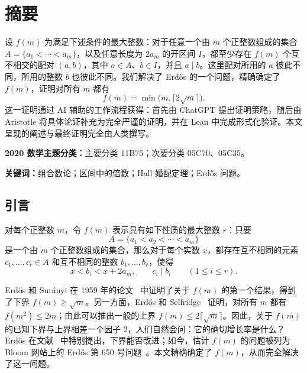 \documentclass[UTF8,a4paper,oneside,openany,fontset=fandol,zihao=-4]{ctexbook}
\theoremstyle{chinesestyle}
\begin{document}
\clearpage
\tableofcontents
\clearpage
\mainmatter
\chapter*{摘要}

设 $f(m)$ 为满足下述条件的最大整数：对于任意一个由 $m$ 个正整数组成的集合 $A=\{a_1<\cdots<a_m\}$，以及任意长度为 $2a_m$ 的开区间 $I$，都至少存在 $f(m)$ 个互不相交的配对 $(a,b)$，其中 $a\in A$、$b\in I$，并且 $a\mid b$。这里配对所用的 $a$ 彼此不同，所用的整数 $b$ 也彼此不同。我们解决了 Erd\H{o}s 的一个问题，精确确定了 $f(m)$，证明对所有 $m$ 都有
\[
\boxed{f(m)=\min\bigl(m,\lceil2\sqrt m\rceil\bigr).}
\]
这一证明通过 AI 辅助的工作流程获得：首先由 ChatGPT 提出证明策略，随后由 Aristotle 将具体论证补充为完全严谨的证明，并在 Lean 中完成形式化验证。本文呈现的阐述与最终证明完全由人类撰写。

\medskip
\noindent\textbf{2020 数学主题分类：}主要分类 11B75；次要分类 05C70、05C35。

\smallskip
\noindent\textbf{关键词：}组合数论；区间中的倍数；Hall 婚配定理；Erd\H{o}s 问题。

\section{引言}\label{sec:introduction}

对每个正整数 $m$，令 $f(m)$ 表示具有如下性质的最大整数 $r$：只要
\[
A=\{a_1<a_2<\cdots<a_m\}
\]
是一个由 $m$ 个正整数组成的集合，那么对于每个实数 $x$，都存在互不相同的元素 $c_1,\ldots,c_r\in A$ 和互不相同的整数 $b_1,\ldots,b_r$，使得
\[
x<b_i<x+2a_m,
\qquad c_i\mid b_i
\qquad (1\leq i\leq r).
\]

Erd\H{o}s 和 Sur\'{a}nyi 在 1959 年的论文~\cite{ref10} 中证明了关于 $f(m)$ 的第一个结果，得到了下界 $f(m)\geq\sqrt m$。另一方面，Erd\H{o}s 和 Selfridge~\cite{ref7,ref8} 证明，对所有 $m$ 都有 $f(m^2)\leq 2m$；由此可以推出一般的上界 $f(m)\leq 2\lceil\sqrt m\rceil$。因此，关于 $f(m)$ 的已知下界与上界相差一个因子 $2$，人们自然会问：它的确切增长率是什么？Erd\H{o}s 在文献~\cite{ref9} 中特别提出，下界能否改进；如今，估计 $f(m)$ 的问题被列为 Bloom 网站上的 Erd\H{o}s 第 650 号问题~\cite{ref2}。本文精确确定了 $f(m)$，从而完全解决了这一问题。
\end{document}
